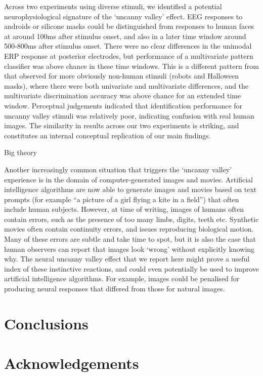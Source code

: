\documentclass[
]{article}
\begin{document}
Across two experiments using diverse stimuli, we identified a potential neurophysiological signature of the `uncanny valley' effect. EEG responses to androids or silicone masks could be distinguished from responses to human faces at around 100ms after stimulus onset, and also in a later time window around 500-800ms after stimulus onset. There were no clear differences in the unimodal ERP response at posterior electrodes, but performance of a multivariate pattern classifier was above chance in these time windows. This is a different pattern from that observed for more obviously non-human stimuli (robots and Halloween masks), where there were both univariate and multivariate differences, and the multivariate discrimination accuracy was above chance for an extended time window. Perceptual judgements indicated that identification performance for uncanny valley stimuli was relatively poor, indicating confusion with real human images. The similarity in results across our two experiments is striking, and constitutes an internal conceptual replication of our main findings.

Big theory

Another increasingly common situation that triggers the `uncanny valley' experience is in the domain of computer-generated images and movies. Artificial intelligence algorithms are now able to generate images and movies based on text prompts (for example ``a picture of a girl flying a kite in a field'') that often include human subjects. However, at time of writing, images of humans often contain errors, such as the presence of too many limbs, digits, teeth etc. Synthetic movies often contain continuity errors, and issues reproducing biological motion. Many of these errors are subtle and take time to spot, but it is also the case that human observers can report that images look `wrong' without explicitly knowing why. The neural uncanny valley effect that we report here might prove a useful index of these instinctive reactions, and could even potentially be used to improve artificial intelligence algorithms. For example, images could be penalised for producing neural responses that differed from those for natural images.

\hypertarget{conclusions}{%
\section{Conclusions}\label{conclusions}}

\hypertarget{acknowledgements}{%
\section{Acknowledgements}\label{acknowledgements}}
\end{document}
